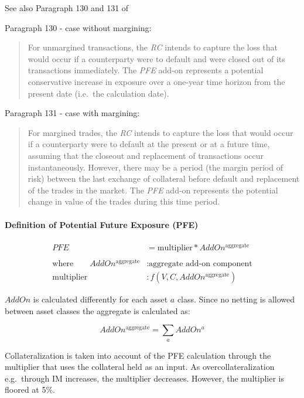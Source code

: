 See also Paragraph 130 and 131 of \cite{SACCR}

    Paragraph 130 - case without margining:

\begin{quote}
For unmargined transactions, the \emph{RC} intends to capture the loss
that would occur if a counterparty were to default and were closed out
of its transactions immediately. The \emph{PFE} add-on represents a
potential conservative increase in exposure over a one-year time horizon
from the present date (i.e.~the calculation date).
\end{quote}

Paragraph 131 - case with margining:

\begin{quote}
For margined trades, the \emph{RC} intends to capture the loss that
would occur if a counterparty were to default at the present or at a
future time, assuming that the closeout and replacement of transactions
occur instantaneously. However, there may be a period (the margin period
of risk) between the last exchange of collateral before default and
replacement of the trades in the market. The \emph{PFE} add-on
represents the potential change in value of the trades during this time
period.
\end{quote}

    \hypertarget{definition-of-potential-future-exposure-pfe}{%
\paragraph{Definition of Potential Future Exposure
(PFE)}\label{definition-of-potential-future-exposure-pfe}}

\begin{align*}
PFE &= \text{multiplier} * AddOn^{\text{aggregate}} \\
\\
\text{where} \qquad AddOn^{\text{aggregate}} &: \text{aggregate add-on component} \\
\text{multiplier} &: f(V,C,AddOn^{\text{aggregate}})
\end{align*}

\(AddOn\) is calculated differently for each asset \(a\) class. Since no
netting is allowed between asset classes the aggregate is calculated as:

\[AddOn^{\text{aggregate}} = \sum_{a}AddOn^{a}\]

Collateralization is taken into account of the PFE calculation through
the multiplier that uses the collateral held as an input. As
overcollateralization e.g.~through IM increases, the multiplier
decreases. However, the multiplier is floored at 5\%.

